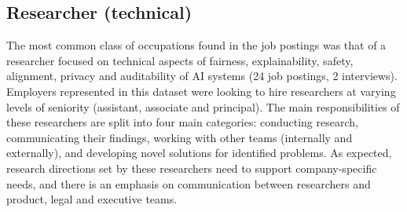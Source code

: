 \documentclass[sigconf]{acmart}
\begin{document}
\subsection{Researcher (technical)}
The most common class of occupations found in the job postings was that of a researcher focused on technical aspects of fairness, explainability, safety, alignment, privacy and auditability of \ac{AI} systems (24 job postings, 2 interviews). 
Employers represented in this dataset were looking to hire researchers at varying levels of seniority (assistant, associate and principal). 
The main responsibilities of these researchers are split into four main categories: conducting research, communicating their findings, working with other teams (internally and externally), and developing novel solutions for identified problems. 
As expected, research directions set by these researchers need to support company-specific needs, and there is an emphasis on communication between researchers and product, legal and executive teams.  
\end{document}
